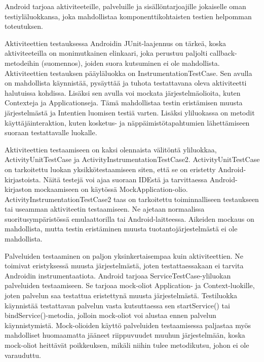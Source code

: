 Android tarjoaa aktiviteeteille, palveluille ja sisällöntarjoajille jokaiselle oman testiyläluokkansa, joka mahdollistaa komponenttikohtaisten testien helpomman toteutuksen.

Aktiviteettien testauksessa Androidin JUnit-laajennus on tärkeä, koska aktiviteeteilla on monimutkainen elinkaari, joka perustuu paljolti callback-metodeihin (suomennos), joiden suora kutsuminen ei ole mahdollista. Aktiviteettien testauksen pääyläluokka on InstrumentationTestCase. Sen avulla on mahdollista käynnistää, pysäyttää ja tuhota testattavana oleva aktiviteetti halutuissa kohdissa. Lisäksi sen avulla voi mockata järjestelmäolioita, kuten Contexteja ja Applicationseja. Tämä mahdollistaa testin eristämisen muusta järjestelmästä ja Intentien luomisen testiä varten. Lisäksi yliluokassa on metodit käyttäjäinteraktion, kuten kosketus- ja näppäimistötapahtumien lähettämiseen suoraan testattavalle luokalle.

Aktiviteettien testaamiseen on kaksi olennaista välitöntä yliluokkaa, ActivityUnitTestCase ja ActivityInstrumentationTestCase2. ActivityUnitTestCase on tarkoitettu luokan yksikkötestaamiseen siten, että se on eristetty Android-kirjastoista. Näitä testejä voi ajaa suoraan IDEstä ja tarvittaessa Android-kirjaston mockaamiseen on käytössä MockApplication-olio. ActivityInstrumentationTestCase2 taas on tarkoitettu toiminnalliseen testaukseen tai useamman aktiviteetin testaamiseen. Ne ajetaan normaalissa suoritusympäristössä emulaattorilla tai Android-laitteessa. Aikeiden mockaus on mahdollista, mutta testin eristäminen muusta tuotantojärjestelmästä ei ole mahdollista.

Palveluiden testaaminen on paljon yksinkertaisempaa kuin aktiviteettien. Ne toimivat eristyksessä muusta järjestelmästä, joten testattaessakaan ei tarvita Androidin instrumentaatiota. Android tarjoaa ServiceTestCase-yliluokan palveluiden testaamiseen. Se tarjoaa mock-oliot Application- ja Context-luokille, joten palvelun saa testattua eristettynä muusta järjestelmästä. Testiluokka käynnistää testattavan palvelun vasta kutsuttaessa sen startService() tai bindService()-metodia, jolloin mock-oliot voi alustaa ennen palvelun käynnistymistä. Mock-olioiden käyttö palveluiden testaamisessa paljastaa myös mahdolliset huomaamatta jääneet riippuvuudet muuhun järjestelmään, koska mock-oliot heittävät poikkeuksen, mikäli niihin tulee metodikutsu, johon ei ole varauduttu.

